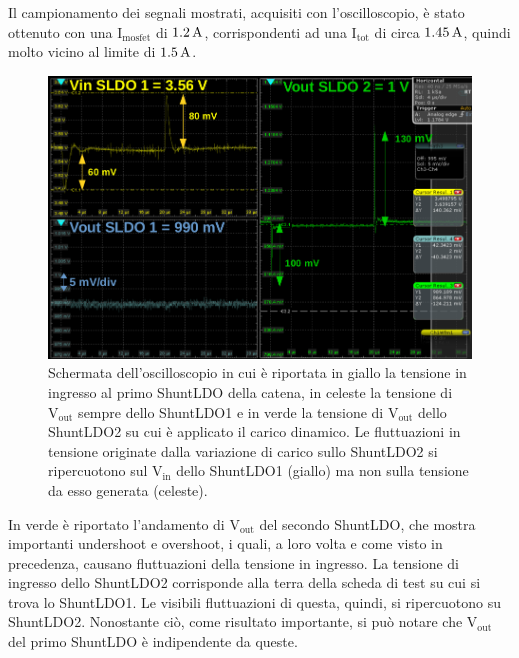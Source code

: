 Il campionamento dei segnali mostrati, acquisiti con l'oscilloscopio, è stato ottenuto con una $\mathrm{I_{mosfet}}$ di $1.2 \rm \, A$, corrispondenti ad una $\mathrm{I_{tot}}$ di circa $1.45 \rm \, A$, quindi molto vicino al limite di $1.5 \rm \, A$. 
\begin{figure}[h!]
\centering
\includegraphics[scale=.32]{Immagini/ScreenSerie}
\caption{Schermata dell'oscilloscopio in cui è riportata in giallo la tensione in ingresso al primo ShuntLDO della catena,  in celeste la tensione di $\mathrm{V_{out}}$ sempre dello ShuntLDO1 e in verde la tensione di $\mathrm{V_{out}}$ dello ShuntLDO2 su cui è applicato il carico dinamico. Le fluttuazioni in tensione originate dalla variazione di carico sullo ShuntLDO2 si ripercuotono sul $\mathrm{V_{in}}$ dello ShuntLDO1 (giallo) ma non sulla tensione da esso generata (celeste).}
\label{ScreenSerie}
\end{figure}
In verde è riportato l'andamento di $\mathrm{V_{out}}$ del secondo ShuntLDO, che mostra importanti undershoot e overshoot, i quali, a loro volta e come visto in precedenza, causano fluttuazioni della tensione in ingresso. 
La tensione di ingresso dello ShuntLDO2 corrisponde alla terra della scheda di test su cui si trova lo ShuntLDO1.
Le visibili fluttuazioni di questa, quindi, si ripercuotono su ShuntLDO2.
Nonostante ciò, come risultato importante, si può notare che $\mathrm{V_{out}}$ del primo ShuntLDO è indipendente da queste.
